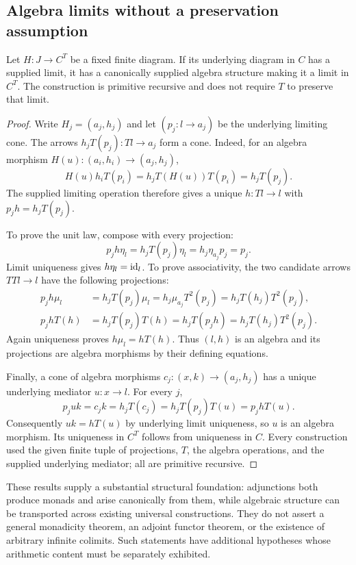 \subsection{Algebra limits without a preservation assumption}

\begin{theorem}
Let $H:J\to C^T$ be a fixed finite diagram.  If its underlying diagram in
$C$ has a supplied limit, it has a canonically supplied algebra structure
making it a limit in $C^T$.  The construction is primitive recursive and
does not require $T$ to preserve that limit.
\end{theorem}
\begin{proof}
Write $H_j=(a_j,h_j)$ and let $(p_j:l\to a_j)$ be the underlying limiting
cone.  The arrows $h_jT(p_j):Tl\to a_j$ form a cone.  Indeed, for an
algebra morphism $H(u):(a_i,h_i)\to(a_j,h_j)$,
\[
 H(u)h_iT(p_i)=h_jT(H(u))T(p_i)=h_jT(p_j).
\]
The supplied limiting operation therefore gives a unique $h:Tl\to l$
with $p_jh=h_jT(p_j)$.

To prove the unit law, compose with every projection:
\[
 p_jh\eta_l=h_jT(p_j)\eta_l
 =h_j\eta_{a_j}p_j=p_j.
\]
Limit uniqueness gives $h\eta_l=\operatorname{id}_l$.  To prove associativity, the two
candidate arrows $TTl\to l$ have the following projections:
\begin{align*}
 p_jh\mu_l
 &=h_jT(p_j)\mu_l
  =h_j\mu_{a_j}T^2(p_j)
  =h_jT(h_j)T^2(p_j),\\
 p_jhT(h)
 &=h_jT(p_j)T(h)
  =h_jT(p_jh)
  =h_jT(h_j)T^2(p_j).
\end{align*}
Again uniqueness proves $h\mu_l=hT(h)$.  Thus $(l,h)$ is an algebra and
its projections are algebra morphisms by their defining equations.

Finally, a cone of algebra morphisms $c_j:(x,k)\to(a_j,h_j)$ has a unique
underlying mediator $u:x\to l$.  For every $j$,
\[
 p_ju k=c_jk=h_jT(c_j)
 =h_jT(p_j)T(u)=p_jhT(u).
\]
Consequently $uk=hT(u)$ by underlying limit uniqueness, so $u$ is an
algebra morphism.  Its uniqueness in $C^T$ follows from uniqueness in $C$.
Every construction used the given finite tuple of projections, $T$, the
algebra operations, and the supplied underlying mediator; all are primitive
recursive.
\end{proof}

These results supply a substantial structural foundation: adjunctions both
produce monads and arise canonically from them, while algebraic structure
can be transported across existing universal constructions.  They do not
assert a general monadicity theorem, an adjoint functor theorem, or the
existence of arbitrary infinite colimits.  Such statements have additional
hypotheses whose arithmetic content must be separately exhibited.
